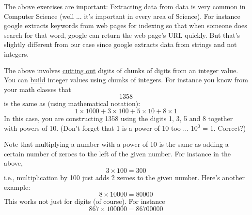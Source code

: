 %

%

%

%

%

%

%

%

The above exercises are important: Extracting data from data is very
common in Computer Science (well ... it's important in every area of
Science). For instance google extracts keywords from web pages for
indexing so that when someone does search for that word, google can
return the web page's URL quickly. But that's slightly different from our
case since google extracts data from strings and not integers.


The above involves \underline{cutting out} digits of chunks of digits from an integer
value. You can \underline{build} integer values using chunks of integers. For
instance you know from your math classes that
\[1358\]
is the same as (using mathematical notation):
\[1\times1000 + 3\times100 + 5\times10 + 8\times1\]
In this case, you are constructing 1358 using the digits 1, 3, 5 and 8
together with powers of 10. (Don't forget that 1 is a power of 10 too ...
10$^0$ = 1. Correct?)

%

Note that multiplying a number with a power of 10 is the same as adding
a certain number of zeroes to the left of the given number. For instance
in the above,
\[3\times100 = 300\]
i.e., multiplication by 100 just adds 2 zeroes to the given number. Here's
another example:
\[8 \times 10000 = 80000\]
This works not just for digits (of course). For instance
\[867 \times 100000 = 86700000\]

%

%
%

%
%

%
%

%
%

